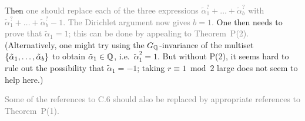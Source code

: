 \documentclass[12pt]{article}
\begin{document}
\begin{itemize}
    Then \textcolor{gray}{one should replace each of the three expressions $\tilde{\alpha}_1^?+\dots+\tilde{\alpha}_b^?$ with $\tilde{\alpha}_1^?+\dots+\tilde{\alpha}_b^?-1$.
    The Dirichlet argument now gives $b=1$.}
    One then needs to \textcolor{gray}{prove that $\tilde{\alpha}_1 = 1$;
    this can be done by appealing to Theorem~P(2).}
    (Alternatively, one might try using the $G_{\mathbb{Q}}$-invariance of the multiset $\{\tilde{\alpha}_1,\dots,\tilde{\alpha}_b\}$ to obtain $\tilde{\alpha}_1\in \mathbb{Q}$, i.e.~$\tilde{\alpha}_1^2 = 1$.
    But without P(2), it seems hard to rule out the possibility that $\tilde{\alpha}_1 = -1$;
    taking $r\equiv 1\bmod{2}$ large does not seem to help here.)
    
    \textcolor{gray}{Some of the references to C.6 should also be replaced by appropriate references to Theorem~P(1).}
\end{itemize}
\end{document}
